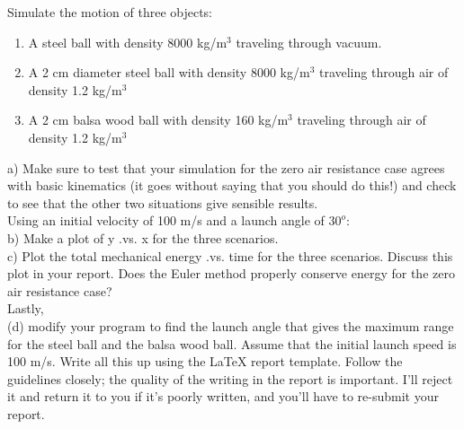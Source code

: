 \begin{prob}
\label{2d}
Simulate the motion of three objects:
\begin{enumerate}
	\item A steel ball with density 8000 kg/m$^3$ traveling through vacuum.
	\item A 2 cm diameter steel ball with density 8000 kg/m$^3$ traveling through air of density 1.2 kg/m$^3$
	\item A  2 cm balsa wood ball with density 160 kg/m$^3$ traveling through air of density 1.2 kg/m$^3$
\end{enumerate}
a) Make sure to test that your simulation for the zero air resistance case agrees with basic kinematics (it goes without saying that you should do this!) and check to see that the other two situations give sensible results. \\
Using an initial velocity of 100 m/s and a launch angle of $30^o$: \\
b) Make a plot of y .vs. x for the three scenarios.\\
c) Plot the total mechanical energy .vs. time for the three scenarios. Discuss this plot in your report. Does the Euler method properly conserve energy for the zero air resistance case? \\
Lastly, \\
(d) modify your program to find the launch angle that gives the maximum range for the steel ball and the balsa wood ball. Assume that the initial launch speed is 100 m/s. 
Write all this up using the LaTeX report template. Follow the guidelines closely; the quality of the writing in the report is important. I'll reject it and return it to you if it's poorly written, and you'll have to re-submit your report.\\


\end{prob}


%
